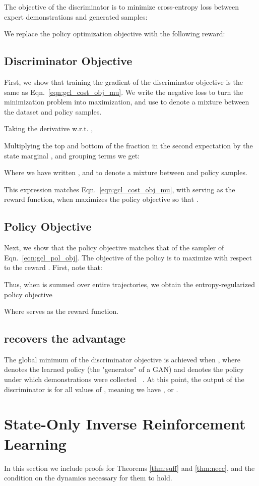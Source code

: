 \documentclass{article} \usepackage{iclr2018_conference,times}
\begin{document}
The objective of the discriminator is to minimize cross-entropy loss between expert demonstrations and generated samples:


We replace the policy optimization objective with the following reward:


\subsection{Discriminator Objective}
First, we show that training the gradient of the discriminator objective is the same as Eqn.~\ref{eqn:gcl_cost_obj_mu}. We write the negative loss to turn the minimization problem into maximization, and use  to denote a mixture between the dataset and policy samples.

Taking the derivative w.r.t. ,

Multiplying the top and bottom of the fraction in the second expectation by the state marginal , and grouping terms we get:

Where we have written , and  to denote a mixture between  and policy samples.

This expression matches Eqn.~\ref{eqn:gcl_cost_obj_mu}, with  serving as the reward function, when  maximizes the policy objective so that .

\subsection{Policy Objective}
Next, we show that the policy objective matches that of the sampler of Eqn.~\ref{eqn:gcl_pol_obj}. The objective of the policy is to maximize with respect to the reward . First, note that:

Thus, when  is summed over entire trajectories, we obtain the entropy-regularized policy objective

Where  serves as the reward function.

\subsection{ recovers the advantage}
\label{app:airl_advantage}
The global minimum of the discriminator objective is achieved when , where  denotes the learned policy (the "generator" of a GAN) and  denotes the policy under which demonstrations were collected ~\citep{gan-goodfellow}. At this point, the output of the discriminator is  for all values of , meaning we have  , or .

\section{State-Only Inverse Reinforcement Learning}
\label{app:state_only}
In this section we include proofs for Theorems \ref{thm:suff} and \ref{thm:necc}, and the condition on the dynamics necessary for them to hold.
\end{document}
